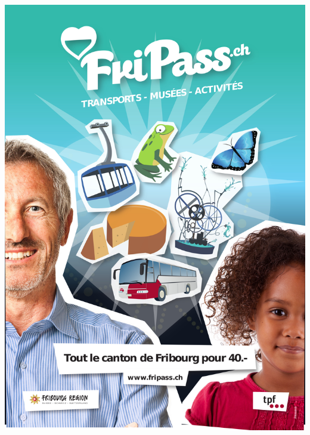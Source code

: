 \clearpage
\thispagestyle{empty}%
{\centering
\includegraphics[width=\textwidth]{fig/fripass.jpg}
\par
}
\clearpage
\thispagestyle{empty}%
